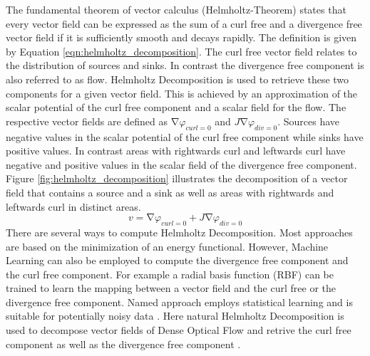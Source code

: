  The fundamental theorem of vector calculus (Helmholtz-Theorem) states that every vector field can be expressed as the sum of a curl free and a divergence free vector field if it is sufficiently smooth and decays rapidly. The definition is given by Equation \ref{eqn:helmholtz_decomposition}. The curl free vector field relates to the distribution of sources and sinks. In contrast the divergence free component is also referred to as flow. Helmholtz Decomposition is used to retrieve these two components for a given vector field. This is achieved by an approximation of the scalar potential of the curl free component and a scalar field for the flow. The respective vector fields are defined as $\mathrm{\nabla}\varphi_{curl=0}$ and $J\mathrm{\nabla}\varphi_{div=0}$. Sources have negative values in the scalar potential of the curl free component while sinks have positive values. In contrast areas with rightwards curl and leftwards curl have negative and positive values in the scalar field of the divergence free component. Figure \ref{fig:helmholtz_decomposition} illustrates the decomposition of a vector field that contains a source and a sink as well as areas with rightwards and leftwards curl in distinct areas.\\
\begin{equation}
  v=\mathrm{\nabla}\varphi_{curl=0}+J\mathrm{\nabla}\varphi_{div=0}
\label{eqn:helmholtz_decomposition}
\end{equation}
 There are several ways to compute Helmholtz Decomposition. Most approaches are based on the minimization of an energy functional. However, Machine Learning can also be employed to compute the divergence free component and the curl free component. For example a radial basis function (RBF) can be trained to learn the mapping between a vector field and the curl free or the divergence free component. Named approach employs statistical learning and is suitable for potentially noisy data \parencite{bhatia2012helmholtz}. Here natural Helmholtz Decomposition is used to decompose vector fields of Dense Optical Flow and retrive the curl free component as well as the divergence free component \parencite{bhatia2014natural}. \\
